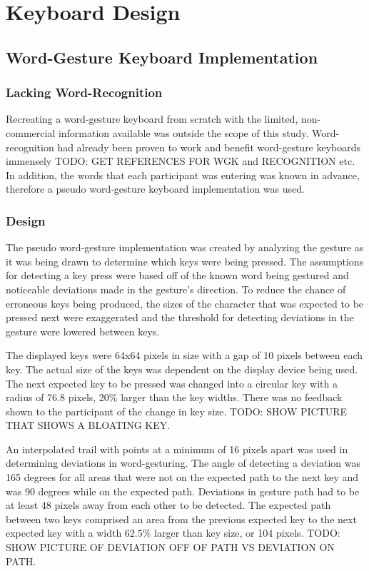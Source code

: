 \chapter{Keyboard Design}

\section{Word-Gesture Keyboard Implementation}

\subsection{Lacking Word-Recognition}
Recreating a word-gesture keyboard from scratch with the limited, non-commercial information available was outside the scope of this study. Word-recognition had already been proven to work and benefit word-gesture keyboards immensely TODO: GET REFERENCES FOR WGK and RECOGNITION etc. In addition, the words that each participant was entering was known in advance, therefore a pseudo word-gesture keyboard implementation was used.

\subsection{Design}
The pseudo word-gesture implementation was created by analyzing the gesture as it was being drawn to determine which keys were being pressed. The assumptions for detecting a key press were based off of the known word being gestured and noticeable deviations made in the gesture's direction. To reduce the chance of erroneous keys being produced, the sizes of the character that was expected to be pressed next were exaggerated and the threshold for detecting deviations in the gesture were lowered between keys.

The displayed keys were 64x64 pixels in size with a gap of 10 pixels between each key. The actual size of the keys was dependent on the display device being used. The next expected key to be pressed was changed into a circular key with a radius of 76.8 pixels, 20\% larger than the key widths. There was no feedback shown to the participant of the change in key size. TODO: SHOW PICTURE THAT SHOWS A BLOATING KEY.

An interpolated trail with points at a minimum of 16 pixels apart was used in determining deviations in word-gesturing. The angle of detecting a deviation was 165 degrees for all areas that were not on the expected path to the next key and was 90 degrees while on the expected path. Deviations in gesture path had to be at least 48 pixels away from each other to be detected. The expected path between two keys comprised an area from the previous expected key to the next expected key with a width 62.5\% larger than key size, or 104 pixels. TODO: SHOW PICTURE OF DEVIATION OFF OF PATH VS DEVIATION ON PATH.

